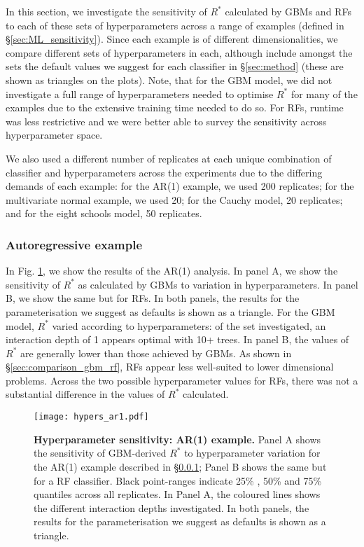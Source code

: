 \documentclass{article}
\begin{document}
In this section, we investigate the sensitivity of $R^*$ calculated by GBMs and RFs to each of these sets of hyperparameters across a range of examples (defined in \S\ref{sec:ML_sensitivity}). Since each example is of different dimensionalities, we compare different sets of hyperparameters in each, although include amongst the sets the default values we suggest for each classifier in \S\ref{sec:method} (these are shown as triangles on the plots). Note, that for the GBM model, we did not investigate a full range of hyperparameters needed to optimise $R^*$ for many of the examples due to the extensive training time needed to do so. For RFs, runtime was less restrictive and we were better able to survey the sensitivity across hyperparameter space.

We also used a different number of replicates at each unique combination of classifier and hyperparameters across the experiments due to the differing demands of each example: for the AR(1) example, we used 200 replicates; for the multivariate normal example, we used 20; for the Cauchy model, 20 replicates; and for the eight schools model, 50 replicates.


\subsubsection{Autoregressive example}\label{sec:hyperparameters_ar1}
In Fig. \ref{fig:hypers_ar1}, we show the results of the AR(1) analysis. In panel A, we show the sensitivity of $R^*$ as calculated by GBMs to variation in hyperparameters. In panel B, we show the same but for RFs. In both panels, the results for the parameterisation we suggest as defaults is shown as a triangle. For the GBM model, $R^*$ varied according to hyperparameters: of the set investigated, an interaction depth of 1 appears optimal with 10+ trees. In panel B, the values of $R^*$ are generally lower than those achieved by GBMs. As shown in \S\ref{sec:comparison_gbm_rf}, RFs appear less well-suited to lower dimensional problems. Across the two possible hyperparameter values for RFs, there was not a substantial difference in the values of $R^*$ calculated.

\begin{figure}[!htb]
	\centerline{\texttt{[image: hypers\_ar1.pdf]}}
	\caption{\textbf{Hyperparameter sensitivity: AR(1) example.} Panel A shows the sensitivity of GBM-derived $R^*$ to hyperparameter variation for the AR(1) example described in \S\ref{sec:hyperparameters_ar1}; Panel B shows the same but for a RF classifier. Black point-ranges indicate 25\% , 50\% and 75\% quantiles across all replicates. In Panel A, the coloured lines shows the different interaction depths investigated. In both panels, the results for the parameterisation we suggest as defaults is shown as a triangle.}
	\label{fig:hypers_ar1}
\end{figure}
\end{document}
